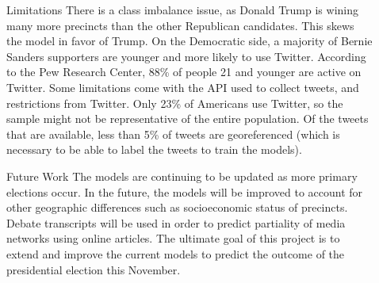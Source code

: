 \documentclass[final]{beamer}
\newlength{\sepwid}
\newlength{\onecolwid}
\newlength{\twocolwid}
\begin{document}
\begin{frame}[t]
\begin{columns}[t]
\begin{column}{\twocolwid}
\begin{columns}[t,totalwidth=\twocolwid]
%
%
%
%
\end{columns} %
%
\end{column} %
%
\begin{column}{\sepwid}\end{column} %
%
\begin{column}{\onecolwid} %


\begin{block}{Limitations}
There is a class imbalance issue, as Donald Trump is wining many more precincts than the other Republican candidates.  This skews the model in favor of Trump.  On the Democratic side, a majority of Bernie Sanders supporters are younger and more likely to use Twitter.  According to the Pew Research Center, 88\% of people 21 and younger are active on Twitter.  Some limitations come with the API used to collect tweets, and restrictions from Twitter.  Only 23\% of Americans use Twitter, so the sample might not be representative of the entire population.  Of the tweets that are available, less than 5\% of tweets are georeferenced (which is necessary to be able to label the tweets to train the models).  
	
\end{block}



\begin{block}{Future Work}
The models are continuing to be updated as more primary elections occur.  In the future, the models will be improved to account for other geographic differences such as socioeconomic status of precincts.  Debate transcripts will be used in order to predict partiality of media networks using online articles.  The ultimate goal of this project is to extend and improve the current models to predict the outcome of the presidential election this November.
	
\end{block}


\end{column}
\end{columns}
\end{frame}
\end{document}
